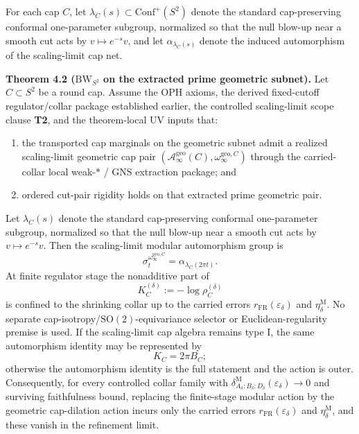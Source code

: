 For each cap \(C\), let \(\lambda_C(s)\subset \mathrm{Conf}^+(S^2)\) denote the standard cap-preserving conformal one-parameter subgroup, normalized so that the null blow-up near a smooth cut acts by \(v\mapsto e^{-s}v\), and let \(\alpha_{\lambda_C(s)}\) denote the induced automorphism of the scaling-limit cap net.

\textbf{Theorem 4.2 (\(\mathrm{BW}_{S^2}\) on the extracted prime geometric subnet).} Let \(C\subset S^2\) be a round cap. Assume the OPH axioms, the derived fixed-cutoff regulator/collar package established earlier, the controlled scaling-limit scope clause \textbf{T2}, and the theorem-local UV inputs that:
\begin{enumerate}
\item the transported cap marginals on the geometric subnet admit a realized scaling-limit geometric cap pair \((\mathcal A_\infty^{\mathrm{geo}}(C),\omega_\infty^{\mathrm{geo},C})\) through the carried-collar local weak-\(*\) / GNS extraction package; and
\item ordered cut-pair rigidity holds on that extracted prime geometric pair.
\end{enumerate}
Let \(\lambda_C(s)\) denote the standard cap-preserving conformal one-parameter subgroup, normalized so that the null blow-up near a smooth cut acts by \(v\mapsto e^{-s}v\). Then the scaling-limit modular automorphism group is
\[
\sigma_t^{\omega_\infty^{\mathrm{geo},C}}
=
\alpha_{\lambda_C(2\pi t)}.
\]
At finite regulator stage the nonadditive part of
\[
K_C^{(\delta)}:=-\log \rho_C^{(\delta)}
\]
is confined to the shrinking collar up to the carried errors \(r_{\mathrm{FR}}(\varepsilon_\delta)\) and \(\eta_\delta^{\mathrm M}\). No separate cap-isotropy/\(\mathrm{SO}(2)\)-equivariance selector or Euclidean-regularity premise is used. If the scaling-limit cap algebra remains type I, the same automorphism identity may be represented by
\[
K_C=2\pi B_C;
\]
otherwise the automorphism identity is the full statement and the action is outer. Consequently, for every controlled collar family with \(\delta^{\mathrm M}_{A_\delta:B_\delta:D_\delta}(\varepsilon_\delta)\to0\) and surviving faithfulness bound, replacing the finite-stage modular action by the geometric cap-dilation action incurs only the carried errors \(r_{\mathrm{FR}}(\varepsilon_\delta)\) and \(\eta_\delta^{\mathrm M}\), and these vanish in the refinement limit.

